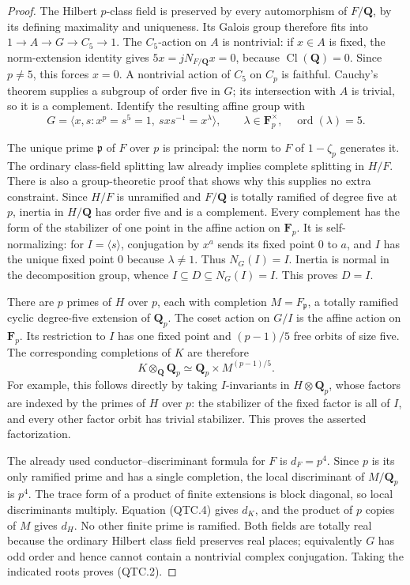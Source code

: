 \begin{proof}
The Hilbert $p$-class field is preserved by every automorphism of
$F/\mathbf Q$, by its defining maximality and uniqueness.  Its Galois
group therefore fits into $1\to A\to G\to C_5\to1$.
The $C_5$-action on $A$ is nontrivial: if $x\in A$ is fixed, the
norm-extension identity gives
$5x=jN_{F/\mathbf Q}x=0$, because $\operatorname{Cl}(\mathbf Q)=0$.
Since $p\ne5$, this forces $x=0$.  A nontrivial action of $C_5$ on
$C_p$ is faithful.  Cauchy's theorem supplies a subgroup of order
five in $G$; its intersection with $A$ is trivial, so it is a
complement.  Identify the resulting affine group with
\[
 G=\langle x,s:x^p=s^5=1,\ sxs^{-1}=x^\lambda\rangle,
 \qquad \lambda\in\mathbf F_p^\times,
 \quad\operatorname{ord}(\lambda)=5.                 \tag{QTC.3}
\]

The unique prime $\mathfrak p$ of $F$ over $p$ is principal:
the norm to $F$ of $1-\zeta_p$ generates it.  The ordinary class-field
splitting law already implies complete splitting in $H/F$.
There is also a group-theoretic proof that shows why this supplies
no extra constraint.  Since $H/F$ is unramified and $F/\mathbf Q$
is totally ramified of degree five at $p$, inertia in $H/\mathbf Q$
has order five and is a complement.  Every complement has the form
of the stabilizer of one point in the affine action on $\mathbf F_p$.
It is self-normalizing: for $I=\langle s\rangle$, conjugation by
$x^a$ sends its fixed point $0$ to $a$, and $I$ has the unique fixed
point $0$ because $\lambda\ne1$.  Thus $N_G(I)=I$.
Inertia is normal in the decomposition group, whence
$I\subseteq D\subseteq N_G(I)=I$.  This proves $D=I$.

There are $p$ primes of $H$ over $p$, each with completion
$M=F_{\mathfrak p}$, a totally ramified cyclic degree-five
extension of $\mathbf Q_p$.  The coset action on $G/I$ is the
affine action on $\mathbf F_p$.  Its restriction to $I$ has one
fixed point and $(p-1)/5$ free orbits of size five.  The corresponding
completions of $K$ are therefore
\[
 K\otimes_{\mathbf Q}\mathbf Q_p
       \simeq\mathbf Q_p\times M^{(p-1)/5}.           \tag{QTC.4}
\]
For example, this follows directly by taking $I$-invariants in
$H\otimes\mathbf Q_p$, whose factors are indexed by the primes
of $H$ over $p$: the stabilizer of the fixed factor is all of $I$,
and every other factor orbit has trivial stabilizer.
This proves the asserted factorization.

The already used conductor--discriminant formula for $F$ is
$d_F=p^4$.  Since $p$ is its only ramified prime and has a single
completion, the local discriminant of $M/\mathbf Q_p$ is $p^4$.
The trace form of a product of finite extensions is block diagonal,
so local discriminants multiply.  Equation (QTC.4) gives $d_K$,
and the product of $p$ copies of $M$ gives $d_H$.  No other finite
prime is ramified.  Both fields are totally real because the ordinary
Hilbert class field preserves real places; equivalently $G$ has odd
order and hence cannot contain a nontrivial complex conjugation.
Taking the indicated roots proves (QTC.2).


\end{proof}
